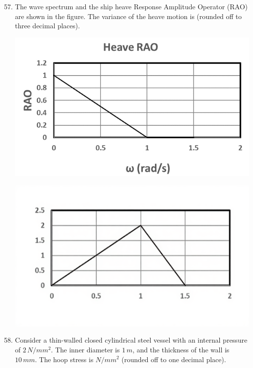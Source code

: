 \documentclass[journal]{IEEEtran}
\theoremstyle{remark}
\begin{document}
\begin{enumerate}[itemsep=1em]
\setcounter{enumi}{56}
\item The wave spectrum and the ship heave Response Amplitude Operator (RAO) are shown in the figure. The variance of the heave motion is \underline{\hspace{2cm}} (rounded off to three decimal places).
\newpage
\vspace*{0.25cm}
\noindent
\begin{minipage}{0.48\columnwidth}
\includegraphics[width=\columnwidth]{figs/fig-19.jpeg}
\end{minipage}\hfill
\begin{minipage}{0.48\columnwidth}
\includegraphics[width=\columnwidth]{figs/fig-20.png}
\end{minipage}
\end{enumerate}
\begin{enumerate}[itemsep=1em]
\setcounter{enumi}{57}
\item Consider a thin-walled closed cylindrical steel vessel with an internal pressure of $2\,N/mm^2$. The inner diameter is $1\,m$, and the thickness of the wall is $10\, mm$. The 
hoop stress is \underline{\hspace{2cm}} $N/mm^2$ (rounded off to one decimal place). 
\end{enumerate}
\end{document}

